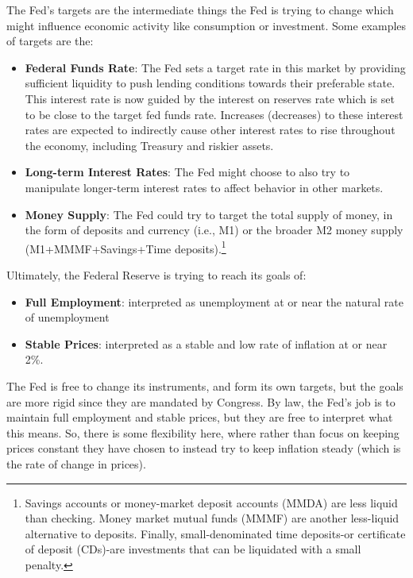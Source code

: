\documentclass[
]{book}
\providecommand{\tightlist}{%
  \setlength{\itemsep}{0pt}\setlength{\parskip}{0pt}}
\begin{document}
The Fed's targets are the intermediate things the Fed is trying to change which might influence economic activity like consumption or investment. Some examples of targets are the:

\begin{itemize}
\tightlist
\item
  \textbf{Federal Funds Rate}: The Fed sets a target rate in this market by providing sufficient liquidity to push lending conditions towards their preferable state. This interest rate is now guided by the interest on reserves rate which is set to be close to the target fed funds rate. Increases (decreases) to these interest rates are expected to indirectly cause other interest rates to rise throughout the economy, including Treasury and riskier assets.
\item
  \textbf{Long-term Interest Rates}: The Fed might choose to also try to manipulate longer-term interest rates to affect behavior in other markets.
\item
  \textbf{Money Supply}: The Fed could try to target the total supply of money, in the form of deposits and currency (i.e., M1) or the broader M2 money supply (M1+MMMF+Savings+Time deposits).\footnote{Savings accounts or money-market deposit accounts (MMDA) are less liquid than checking. Money market mutual funds (MMMF) are another less-liquid alternative to deposits. Finally, small-denominated time deposits-or certificate of deposit (CDs)-are investments that can be liquidated with a small penalty.}
\end{itemize}

Ultimately, the Federal Reserve is trying to reach its goals of:

\begin{itemize}
\tightlist
\item
  \textbf{Full Employment}: interpreted as unemployment at or near the natural rate of unemployment
\item
  \textbf{Stable Prices}: interpreted as a stable and low rate of inflation at or near 2\%.
\end{itemize}

The Fed is free to change its instruments, and form its own targets, but the goals are more rigid since they are mandated by Congress. By law, the Fed's job is to maintain full employment and stable prices, but they are free to interpret what this means. So, there is some flexibility here, where rather than focus on keeping prices constant they have chosen to instead try to keep inflation steady (which is the rate of change in prices).
\end{document}
